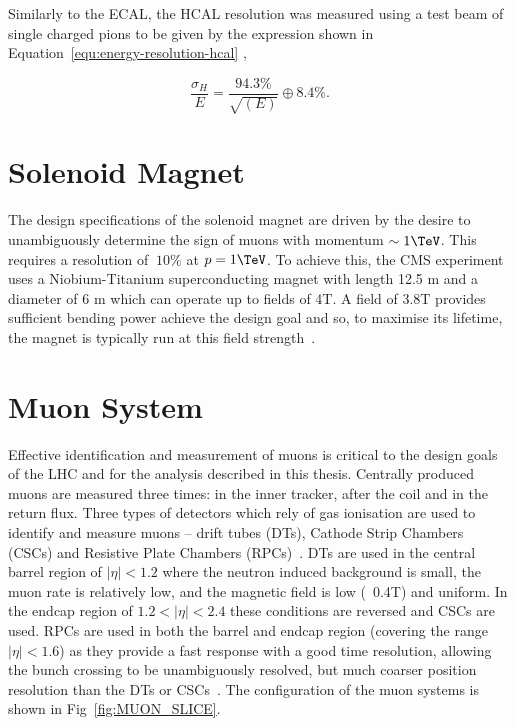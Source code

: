 Similarly to the ECAL, the HCAL resolution was measured using a test beam of single charged pions to be given by the expression shown in Equation~\ref{equ:energy-resolution-hcal} 
\cite{hcal_performance},

\begin{equation}
\frac{\sigma_H}{E} = \frac{94.3\%}{\sqrt{(E)}} \oplus 8.4\%.
\label{equ:energy-resolution-hcal}
\end{equation}

\section{Solenoid Magnet}

The design specifications of the solenoid magnet are driven by the desire to unambiguously determine
the sign of muons with momentum $\sim 1\TeV$. This requires a resolution of $~10\%$ at $p=1\TeV$.
To achieve this, the CMS experiment uses a Niobium-Titanium superconducting magnet with length 
12.5 m and a diameter of 6 m which can operate up to fields of 4T. A field of 3.8T provides
sufficient bending power achieve the design goal and so, to maximise its lifetime, the magnet is
typically run at this field strength~\cite{CMS}.

\section{Muon System}

Effective identification and measurement of muons is critical to the design goals of the LHC and
for the analysis described in this thesis. Centrally produced muons are measured three times:
in the inner tracker, after the coil and in the return flux. Three types of detectors which rely of gas ionisation are 
used to identify and measure muons -- drift tubes (DTs), Cathode Strip Chambers (CSCs) and Resistive
Plate Chambers (RPCs)~\cite{CMS}. DTs are used in the central barrel region of $|\eta| < 1.2$ where 
the neutron induced background is small, the muon rate is relatively low, 
and the magnetic field is low (~0.4T) and uniform. In the endcap region of $ 1.2 < |\eta| < 2.4$ these conditions are 
reversed and CSCs are used. RPCs are used in both the barrel and endcap region (covering the range $|\eta| < 1.6$) as they provide a fast response with a good time 
resolution, allowing the bunch crossing to be unambiguously resolved, but much coarser position resolution than the DTs or CSCs~\cite{muon_tdr}. 
The configuration of the muon systems is shown in Fig~\ref{fig:MUON_SLICE}.

